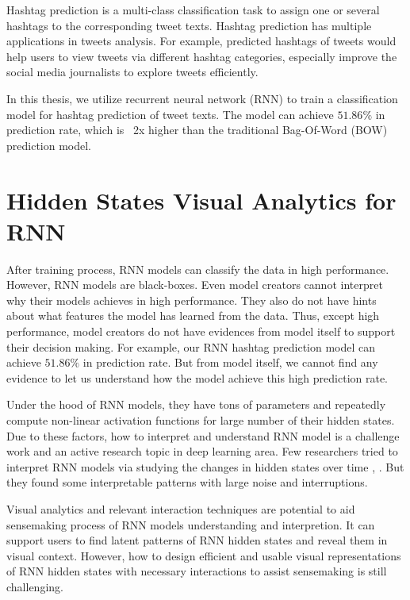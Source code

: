 Hashtag prediction is a multi-class classification task to assign one or several hashtags to the corresponding tweet texts. Hashtag prediction has multiple applications in tweets analysis.  For example, predicted hashtags of tweets would help users to view tweets via different hashtag categories, especially improve the social media journalists to explore tweets efficiently. 

In this thesis, we utilize recurrent neural network (RNN) to train a classification model for hashtag prediction of tweet texts. The model can achieve $51.86\%$ in prediction rate, which is ~2x higher than the traditional Bag-Of-Word (BOW) prediction model.

\section{Hidden States Visual Analytics for RNN}

After training process, RNN models can classify the data in high performance. However, RNN models are black-boxes. Even model creators cannot interpret why their models achieves in high performance. They also do not have hints about what features the model has learned from the data. Thus, except high performance, model creators do not have evidences from model itself to support their decision making.  For example, our RNN hashtag prediction model can achieve $51.86\%$ in prediction rate. But from model itself, we cannot find any evidence to let us understand how the model achieve this high prediction rate. 

Under the hood of RNN models, they have tons of parameters and repeatedly compute non-linear activation functions for large number of their hidden states. Due to these factors, how to interpret and understand RNN model is a challenge work and an active research topic in deep learning area. Few researchers tried to interpret RNN models via studying the changes in hidden states over time \cite{Strobelt2016} \cite{Li2016}, . But they found some interpretable patterns with large noise and interruptions. 

Visual analytics and relevant interaction techniques are potential to aid sensemaking process \cite{Pirolli2005} of RNN models understanding and interpretion. It can support users to find latent patterns of RNN hidden states and reveal them in visual context. However, how to design efficient and usable visual representations of RNN hidden states with necessary interactions to assist sensemaking is still challenging.


